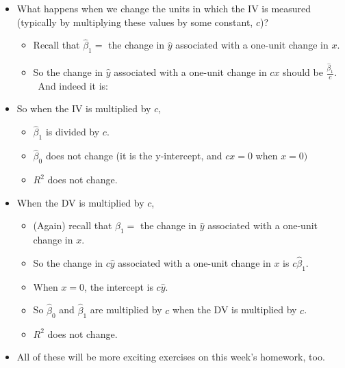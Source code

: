\documentclass[11pt]{article}
\begin{document}
\begin{itemize}
\item What happens when we change the units in which the IV is measured
(typically by multiplying these values by some constant, $c$)?

\begin{itemize}
\item Recall that $\widehat{\beta }_{1}=$ the change in $\widehat{y}$
associated with a one-unit change in $x$.

\item So the change in $\widehat{y}$ associated with a one-unit change in $%
cx $ should be $\frac{\widehat{\beta }_{1}}{c}.$ \ And indeed it is:
\end{itemize}

\item So when the IV is multiplied by $c$,

\begin{itemize}
\item $\widehat{\beta }_{1}$ is divided by $c$.

\item $\widehat{\beta }_{0}$ does not change (it is the y-intercept, and $%
cx=0$ when $x=0)$

\item $R^{2}$ does not change.
\end{itemize}

\item When the DV is multiplied by $c$,

\begin{itemize}
\item (Again) recall that $\widehat{\beta }_{1}=$ the change in $\widehat{y}$
associated with a one-unit change in $x$.

\item So the change in $c\widehat{y}$ associated with a one-unit change in $%
x $ is $c\widehat{\beta }_{1}.$

\item When $x=0$, the intercept is $c\widehat{y}$.

\item So $\widehat{\beta }_{0}$ and $\widehat{\beta }_{1}$ are multiplied by 
$c$ when the DV is multiplied by $c$.

\item $R^{2}$ does not change.
\end{itemize}

\item All of these will be more exciting exercises on this week's homework,
too.
\end{itemize}
\end{document}
